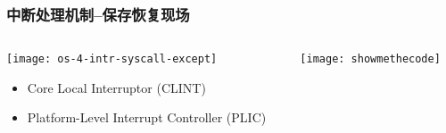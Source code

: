 \begin{frame}[plain,t]
	\frametitle{中断处理机制--保存恢复现场}
	\begin{columns}
		
		\begin{column}{0.4\textwidth}
			\centering
			\texttt{[image: os-4-intr-syscall-except]}
			\begin{itemize} \small
				\item Core Local	Interruptor (CLINT)
				\item Platform-Level Interrupt Controller (PLIC)
			\end{itemize}
			
		\end{column}
		
		\begin{column}{0.6\textwidth}
			
			\centering
			
			\texttt{[image: showmethecode]}
		
		\end{column}
		
	\end{columns}
	
\end{frame}

